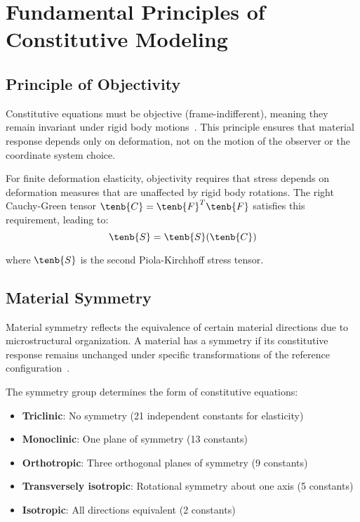 \section{Fundamental Principles of Constitutive Modeling}

\subsection{Principle of Objectivity}

Constitutive equations must be objective (frame-indifferent), meaning they remain invariant under rigid body motions~\autocite{Sadd.2019}. This principle ensures that material response depends only on deformation, not on the motion of the observer or the coordinate system choice.

For finite deformation elasticity, objectivity requires that stress depends on deformation measures that are unaffected by rigid body rotations. The right Cauchy-Green tensor $\tenb{C} = \tenb{F}^T \tenb{F}$ satisfies this requirement, leading to:
\begin{equation}
\tenb{S} = \tenb{S}(\tenb{C})
\end{equation}

where $\tenb{S}$ is the second Piola-Kirchhoff stress tensor.

\subsection{Material Symmetry}

Material symmetry reflects the equivalence of certain material directions due to microstructural organization. A material has a symmetry if its constitutive response remains unchanged under specific transformations of the reference configuration~\autocite{Sadd.2019}.

The symmetry group determines the form of constitutive equations:
\begin{itemize}
\item \textbf{Triclinic}: No symmetry (21 independent constants for elasticity)
\item \textbf{Monoclinic}: One plane of symmetry (13 constants)
\item \textbf{Orthotropic}: Three orthogonal planes of symmetry (9 constants)
\item \textbf{Transversely isotropic}: Rotational symmetry about one axis (5 constants)
\item \textbf{Isotropic}: All directions equivalent (2 constants)
\end{itemize}

